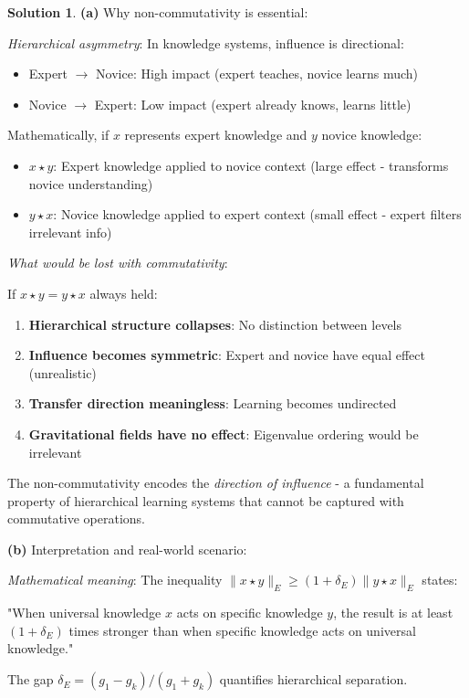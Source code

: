 \documentclass[12pt,a4paper]{book}
\theoremstyle{definition}
\newtheorem{solution}{Solution}[section]
\theoremstyle{remark}
\begin{document}
\begin{solution}
\textbf{(a)} Why non-commutativity is essential:

\textit{Hierarchical asymmetry}: In knowledge systems, influence is directional:
\begin{itemize}
\item Expert $\to$ Novice: High impact (expert teaches, novice learns much)
\item Novice $\to$ Expert: Low impact (expert already knows, learns little)
\end{itemize}

Mathematically, if $x$ represents expert knowledge and $y$ novice knowledge:
\begin{itemize}
\item $x \star y$: Expert knowledge applied to novice context (large effect - transforms novice understanding)
\item $y \star x$: Novice knowledge applied to expert context (small effect - expert filters irrelevant info)
\end{itemize}

\textit{What would be lost with commutativity}:

If $x \star y = y \star x$ always held:
\begin{enumerate}
\item \textbf{Hierarchical structure collapses}: No distinction between levels
\item \textbf{Influence becomes symmetric}: Expert and novice have equal effect (unrealistic)
\item \textbf{Transfer direction meaningless}: Learning becomes undirected
\item \textbf{Gravitational fields have no effect}: Eigenvalue ordering would be irrelevant
\end{enumerate}

The non-commutativity encodes the \textit{direction of influence} - a fundamental property of hierarchical learning systems that cannot be captured with commutative operations.

\textbf{(b)} Interpretation and real-world scenario:

\textit{Mathematical meaning}: The inequality $\|x \star y\|_E \geq (1+\delta_E) \|y \star x\|_E$ states:

"When universal knowledge $x$ acts on specific knowledge $y$, the result is at least $(1+\delta_E)$ times stronger than when specific knowledge acts on universal knowledge."

The gap $\delta_E = (g_1 - g_k)/(g_1 + g_k)$ quantifies hierarchical separation.


\end{solution}
\end{document}
